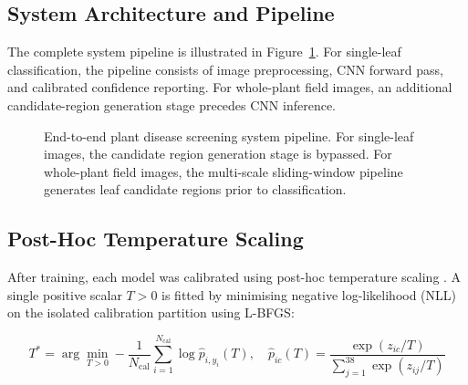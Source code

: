 \documentclass[pdflatex,sn-mathphys-num]{sn-jnl}
\theoremstyle{thmstyleone}%
\theoremstyle{thmstyletwo}%
\theoremstyle{thmstylethree}%
\begin{document}
\subsection{System Architecture and Pipeline}
\label{sec:system_pipeline}

The complete system pipeline is illustrated in Figure~\ref{fig:pipeline}. For single-leaf
classification, the pipeline consists of image preprocessing, CNN forward pass, and
calibrated confidence reporting. For whole-plant field images, an additional candidate-region
generation stage precedes CNN inference.

\begin{figure}[h]
  \centering
  \caption{End-to-end plant disease screening system pipeline. For single-leaf images,
  the candidate region generation stage is bypassed. For whole-plant field images, the
  multi-scale sliding-window pipeline generates leaf candidate regions prior to
  classification.}
  \label{fig:pipeline}
\end{figure}

\subsection{Post-Hoc Temperature Scaling}
\label{sec:calibration_method}

After training, each model was calibrated using post-hoc temperature scaling
\citep{guo2017calibration}. A single positive scalar $T > 0$ is fitted by minimising
negative log-likelihood (NLL) on the isolated calibration partition using L-BFGS:

\begin{equation}
  T^* = \arg\min_{T > 0} -\frac{1}{N_{\text{cal}}} \sum_{i=1}^{N_{\text{cal}}}
  \log \hat{p}_{i, y_i}(T),
  \quad \hat{p}_{ic}(T) = \frac{\exp(z_{ic}/T)}{\sum_{j=1}^{38} \exp(z_{ij}/T)}
  \label{eq:temperature_scaling}
\end{equation}
\end{document}
